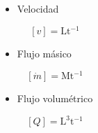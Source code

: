 \documentclass[t]{beamer}
\begin{document}
\begin{frame}
\begin{columns}

\begin{itemize}
\item Velocidad
\vspace{-0.5cm}

$$[v] =\mathrm{ Lt^{-1}}$$
\vspace{-0.6cm}

\item Flujo másico
\vspace{-0.5cm}

$$[\dot{m}] = \mathrm{Mt^{-1}}$$
\vspace{-0.6cm}
\item Flujo volumétrico
\vspace{-0.5cm}

$$[Q] = \mathrm{L^3t^{-1}}$$



\end{itemize}

\end{columns}
\end{frame}

\end{document}
